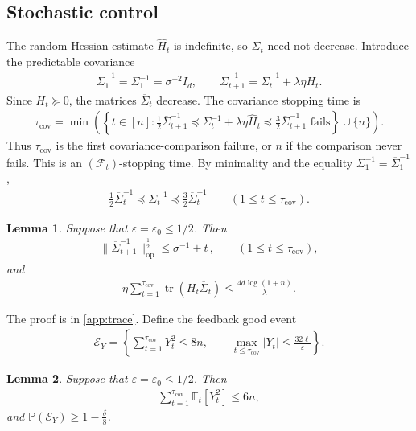 \documentclass[11pt]{article}
\newtheorem{lemma}[lemma]{Lemma}
\newcommand{\E}{\mathbb E}
\newcommand{\Pp}{\mathbb P}
\newcommand{\tr}{\operatorname{tr}}
\newcommand{\Lip}{\operatorname{Lip}}
\newcommand{\op}{\mathrm{op}}
\newcommand{\1}{\mathbf 1}
\newcommand{\eps}{\varepsilon}
\begin{document}
\subsection{Stochastic control}
\label{sec:stochastic-control}
The random Hessian estimate $\hat{H}_t$ is indefinite, so $\Sigma_t$ need not decrease.
Introduce the predictable covariance
\begin{align}
    \overline\Sigma_1^{-1}=\Sigma_1^{-1} = \sigma^{-2}I_d,
    \qquad
    \overline\Sigma_{t+1}^{-1}
    =\overline\Sigma_t^{-1}+\lambda\eta H_t.
    \label{eq:predictable-covariance}
\end{align}
Since $H_t\succeq0$, the matrices $\overline\Sigma_t$ decrease.
The covariance stopping time is
\begin{align}
    \tau_{\mathrm{cov}}
    =
    \min\left(
    \left\{
    t \in [n]:
    \frac12 \overline\Sigma_{t+1}^{-1}
    \preceq
    \Sigma_t^{-1}+\lambda\eta\widehat H_t
    \preceq
    \frac32 \overline\Sigma_{t+1}^{-1}
    \text{ fails}
    \right\}
    \cup\{n\}
    \right).
    \label{eq:covariance-stopping-time}
\end{align}
Thus $\tau_{\mathrm{cov}}$ is the first covariance-comparison failure, or $n$
if the comparison never fails.  This is an $(\mathcal F_t)$-stopping time.
By minimality and the equality $\Sigma_1^{-1}=\overline\Sigma_1^{-1}$,
\begin{align}
    \frac12\overline\Sigma_t^{-1}
    \preceq\Sigma_t^{-1}
    \preceq\frac32\overline\Sigma_t^{-1}
    \qquad(1\leq t\leq\tau_{\mathrm{cov}}).
    \label{eq:covariance-comparison}
\end{align}
\begin{lemma}
    \label{lem:trace}
    Suppose that $\eps=\eps_0\leq1/2$. Then
    \begin{align}
        \|\overline\Sigma_{t+1}^{-1}\|_{\op}^{\frac12}
        \leq
        \sigma^{-1}+t\,,
        \qquad(1\leq t\leq \tau_{\mathrm{cov}}),
        \label{eq:predictable-spectrum}
    \end{align}
    and
    \begin{align}
        \eta\sum_{t=1}^{\tau_{\mathrm{cov}}}
        \tr(H_t\overline\Sigma_t)
        \leq\frac{4d\log(1 + n)}{\lambda}.
        \label{eq:trace-budget}
    \end{align}
\end{lemma}
The proof is in \cref{app:trace}.
Define the feedback good event
\begin{align}
    \mathcal E_Y
    =
    \left\{
    \sum_{t=1}^{\tau_{\mathrm{cov}}}Y_t^2\leq 8n,
    \qquad
    \max_{t\leq\tau_{\mathrm{cov}}}|Y_t|
    \leq
    \frac{32\ell}{\eps}
    \right\}.
    \label{eq:feedback-good-event}
\end{align}
\begin{lemma}
    \label{lem:feedback}
    Suppose that $\eps=\eps_0\leq 1/2$.
    Then
    \begin{align}
        \sum_{t=1}^{\tau_{\mathrm{cov}}}
        \E_t[Y_t^2]
        \leq 6n,
        \label{eq:predictable-Y2}
    \end{align}
    and $\Pp(\mathcal E_Y) \geq 1-\frac{\delta}{8}$.
\end{lemma}
\end{document}
